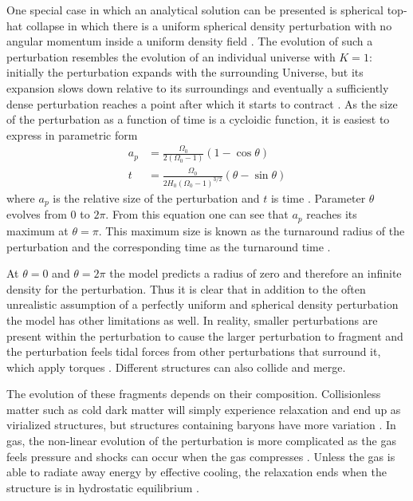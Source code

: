 \documentclass[english, oneside]{HYgradu}
\begin{document}
One special case in which an analytical solution can be presented is spherical top-hat collapse in which there is a uniform spherical density perturbation with no angular momentum inside a uniform density field \citep{longair2008galaxy}. The evolution of such a perturbation resembles the evolution of an individual universe with $K = 1$: initially the perturbation expands with the surrounding Universe, but its expansion slows down relative to its surroundings and eventually a sufficiently dense perturbation reaches a point after which it starts to contract \citep{longair2008galaxy}. As the size of the perturbation as a function of time is a cycloidic function, it is easiest to express in parametric form
\begin{align}
a_p &= \frac{\Omega_0}{2(\Omega_0-1)}(1-\cos\theta) \\
t &= \frac{\Omega_0}{2H_0(\Omega_0-1)^{3/2}}(\theta - \sin\theta)
\end{align}
where $a_p$ is the relative size of the perturbation and $t$ is time \citep{longair2008galaxy}. Parameter $\theta$ evolves from 0 to $2\pi$. From this equation one can see that $a_p$ reaches its maximum at $\theta = \pi$. This maximum size is known as the turnaround radius of the perturbation and the corresponding time as the turnaround time \citep{mo2010galaxy}.

At $\theta=0$ and $\theta = 2\pi$ the model predicts a radius of zero and therefore an infinite density for the perturbation. Thus it is clear that in addition to the often unrealistic assumption of a perfectly uniform and spherical density perturbation the model has other limitations as well. In reality, smaller perturbations are present within the perturbation to cause the larger perturbation to fragment and the perturbation feels tidal forces from other perturbations that surround it, which apply torques \citep{longair2008galaxy}. Different structures can also collide and merge.

The evolution of these fragments depends on their composition. Collisionless matter such as cold dark matter will simply experience relaxation and end up as virialized structures, but structures containing baryons have more variation \citep{mo2010galaxy}. In gas, the non-linear evolution of the perturbation is more complicated as the gas feels pressure and shocks can occur when the gas compresses \citep{mo2010galaxy}. Unless the gas is able to radiate away energy by effective cooling, the relaxation ends when the structure is in hydrostatic equilibrium \citep{mo2010galaxy}.
\end{document}
